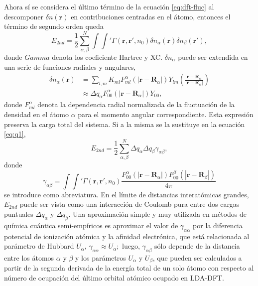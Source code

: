 \begin{enumerate}
        Ahora sí se considera el último término de la ecuación \ref{eq:dft-fluc}
        al descomponer $\delta n(\mathbf{r})$ en contribuciones centradas en el
        átomo, entonces el término de segundo orden queda
        \begin{equation}\label{eq:q1}
        E_{2nd} = \frac{1}{2} \sum_{\alpha, \beta}^N \int \int' \Gamma(\mathbf{r}, \mathbf{r}', n_0) \delta n_{\alpha}(\mathbf{r}) \delta n_{\beta}(\mathbf{r}'),
        \end{equation}
        donde $Gamma$ denota los coeficiente Hartree y XC. $\delta n_{\alpha}$
        puede ser extendida en una serie de funciones radiales y angulares,
        \begin{equation*}
            \begin{aligned}
                \delta n_{\alpha}(\mathbf{r}) &= \sum_{l,m} K_{ml} F_{ml}^{\alpha}(|\mathbf{r} - \mathbf{R}_{\alpha}|) Y_{lm} \left(\frac{\mathbf{r}-\mathbf{R}_{\alpha}}{|\mathbf{r}-\mathbf{R}_{\alpha}|}\right) \\
                &\approx \Delta q_{\alpha} F_{00}^{\alpha}(|\mathbf{r} - \mathbf{R}_{\alpha}|) Y_{00},
            \end{aligned}
        \end{equation*}
        donde $F_{ml}^{\alpha}$ denota la dependencia radial normalizada de la
        fluctuación de la densidad en el átomo $\alpha$ para el momento angular
        correspondiente. Esta expresión preserva la carga total del sistema.
        Si a la misma se la sustituye en la ecuación \ref{eq:q1},
        $$
        E_{2nd} = \frac{1}{2} \sum_{\alpha,\beta}^N \Delta q_{\alpha} \Delta q_{\beta} \gamma_{\alpha\beta},
        $$
        donde
        $$
        \gamma_{\alpha\beta} = \int \int' \Gamma(\mathbf{r},\mathbf{r}',n_0)\frac{F_{00}^{\alpha}(|\mathbf{r} - \mathbf{R}_{\alpha}|)F_{00}^{\beta}(|\mathbf{r} - \mathbf{R}_{\beta}|)}{4 \pi}
        $$
        se introduce como abreviatura. En el límite de distancias interatómicas
        grandes, $E_{2nd}$ puede ser vista como una interacción de Coulomb pura
        entre dos cargas puntuales $\Delta q_{\alpha}$ y $\Delta q_{\beta}$. Una
        aproximación simple y muy utilizada en métodos de química cuántica 
        semi-empíricos es aproximar el valor de $\gamma_{\alpha\alpha}$ por la 
        diferencia potencial de ionización atómica y la afinidad electrónica, que
        está relacionada al parámetro de Hubbard $U_{\alpha}$, 
        $\gamma_{\alpha\alpha} \approx U_{\alpha};$ luego, $\gamma_{\alpha\beta}$ 
        sólo depende de la distancia entre los átomos $\alpha$ y $\beta$ y los 
        parámetros $U_{\alpha}$ y $U_{\beta}$, que pueden ser calculados a partir 
        de la segunda derivada de la energía total de un solo átomo con respecto 
        al número de ocupación del último orbital atómico ocupado en LDA-DFT.


\end{enumerate}

